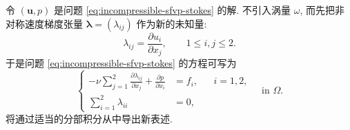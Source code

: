 令 $(\mathbf u,p)$ 是问题
\eqref{eq:incompressible-sfvp-stokes} 的解.
不引入涡量 $\omega$, 而先把非对称速度梯度张量
$\boldsymbol\lambda=(\lambda_{ij})$
作为新的未知量:
\begin{equation}\label{eq:incompressible-hhj-velocity-gradient}
\lambda_{ij}=\frac{\partial u_i}{\partial x_j},
\qquad1\leq i,j\leq2.
\end{equation}
于是问题 \eqref{eq:incompressible-sfvp-stokes} 的方程可写为
\begin{equation}\label{eq:incompressible-hhj-gradient-system}
\left\{
\begin{aligned}
-\nu\sum_{j=1}^2\frac{\partial\lambda_{ij}}{\partial x_j}
+\frac{\partial p}{\partial x_i}&=f_i,
&&i=1,2,\\
\sum_{i=1}^2\lambda_{ii}&=0,
\end{aligned}
\right.
\quad\text{in }\Omega.
\end{equation}
将通过适当的分部积分从中导出新表述.

